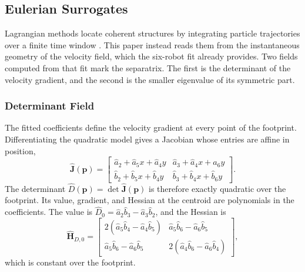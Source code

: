 \documentclass[lettersize,journal]{IEEEtran}
\begin{document}

\subsection{Eulerian Surrogates}
\label{sec:surrogates}

Lagrangian methods locate coherent structures by integrating particle
trajectories over a finite time window \cite{14,15}. This paper instead
reads them from the instantaneous geometry of the velocity field, which
the six-robot fit already provides. Two fields computed from that fit
mark the separatrix. The first is the determinant of the velocity
gradient, and the second is the smaller eigenvalue of its symmetric
part.

\subsubsection{Determinant Field}
The fitted coefficients define the velocity gradient at every point of
the footprint. Differentiating the quadratic model gives a Jacobian whose
entries are affine in position,
\begin{equation}
    \hat{\mathbf{J}}(\mathbf{p}) =
    \begin{bmatrix}
        \hat{a}_2 + \hat{a}_5 x + \hat{a}_4 y &
        \hat{a}_3 + \hat{a}_4 x + \hat{a}_6 y \\
        \hat{b}_2 + \hat{b}_5 x + \hat{b}_4 y &
        \hat{b}_3 + \hat{b}_4 x + \hat{b}_6 y
    \end{bmatrix}.
    \label{eq:Jhat}
\end{equation}
The determinant $\hat{D}(\mathbf{p}) = \det\hat{\mathbf{J}}(\mathbf{p})$
is therefore exactly quadratic over the footprint. Its value, gradient,
and Hessian at the centroid are polynomials in the coefficients. The
value is $\hat{D}_0 = \hat{a}_2\hat{b}_3 - \hat{a}_3\hat{b}_2$, and the
Hessian is
\begin{equation}
    \hat{\mathbf{H}}_{D,0} =
    \begin{bmatrix}
        2(\hat{a}_5\hat{b}_4 - \hat{a}_4\hat{b}_5) &
        \hat{a}_5\hat{b}_6 - \hat{a}_6\hat{b}_5 \\
        \hat{a}_5\hat{b}_6 - \hat{a}_6\hat{b}_5 &
        2(\hat{a}_4\hat{b}_6 - \hat{a}_6\hat{b}_4)
    \end{bmatrix},
    \label{eq:hess_det}
\end{equation}
which is constant over the footprint.
\end{document}
